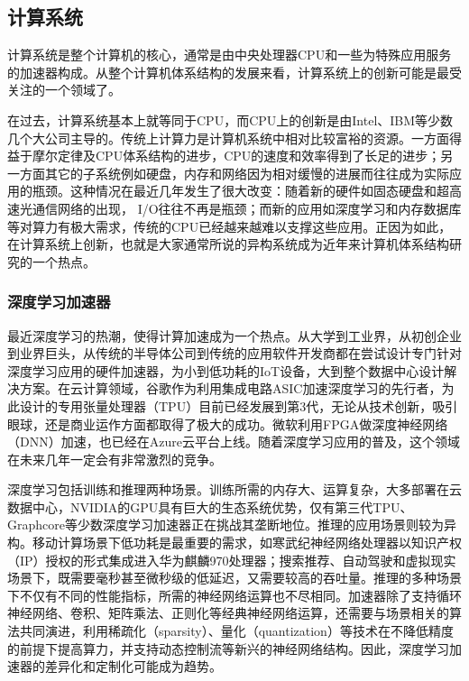 \subsection{计算系统}

计算系统是整个计算机的核心，通常是由中央处理器CPU和一些为特殊应用服务的加速器构成。从整个计算机体系结构的发展来看，计算系统上的创新可能是最受关注的一个领域了。

在过去，计算系统基本上就等同于CPU，而CPU上的创新是由Intel、IBM等少数几个大公司主导的。传统上计算力是计算机系统中相对比较富裕的资源。一方面得益于摩尔定律及CPU体系结构的进步，CPU的速度和效率得到了长足的进步；另一方面其它的子系统例如硬盘，内存和网络因为相对缓慢的进展而往往成为实际应用的瓶颈。这种情况在最近几年发生了很大改变：随着新的硬件如固态硬盘和超高速光通信网络的出现， I/O往往不再是瓶颈；而新的应用如深度学习和内存数据库等对算力有极大需求，传统的CPU已经越来越难以支撑这些应用。正因为如此，在计算系统上创新，也就是大家通常所说的异构系统成为近年来计算机体系结构研究的一个热点。

\subsubsection{深度学习加速器}

最近深度学习的热潮，使得计算加速成为一个热点。从大学到工业界，从初创企业到业界巨头，从传统的半导体公司到传统的应用软件开发商都在尝试设计专门针对深度学习应用的硬件加速器，为小到低功耗的IoT设备，大到整个数据中心设计解决方案。在云计算领域，谷歌作为利用集成电路ASIC加速深度学习的先行者，为此设计的专用张量处理器（TPU）目前已经发展到第3代，无论从技术创新，吸引眼球，还是商业运作方面都取得了极大的成功。微软利用FPGA做深度神经网络（DNN）加速，也已经在Azure云平台上线。随着深度学习应用的普及，这个领域在未来几年一定会有非常激烈的竞争。

深度学习包括训练和推理两种场景。训练所需的内存大、运算复杂，大多部署在云数据中心，NVIDIA的GPU具有巨大的生态系统优势，仅有第三代TPU、Graphcore等少数深度学习加速器正在挑战其垄断地位。推理的应用场景则较为异构。移动计算场景下低功耗是最重要的需求，如寒武纪神经网络处理器以知识产权（IP）授权的形式集成进入华为麒麟970处理器；搜索推荐、自动驾驶和虚拟现实场景下，既需要毫秒甚至微秒级的低延迟，又需要较高的吞吐量。推理的多种场景下不仅有不同的性能指标，所需的神经网络运算也不尽相同。加速器除了支持循环神经网络、卷积、矩阵乘法、正则化等经典神经网络运算，还需要与场景相关的算法共同演进，利用稀疏化（sparsity）、量化（quantization）等技术在不降低精度的前提下提高算力，并支持动态控制流等新兴的神经网络结构。因此，深度学习加速器的差异化和定制化可能成为趋势。

